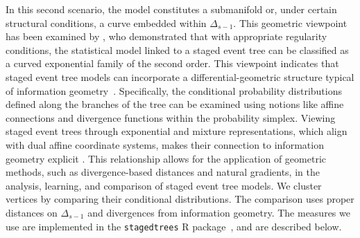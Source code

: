 \documentclass[preprint,12pt]{elsarticle}
\newcommand{\blue}{\color{blue}}
\begin{document}

In this second scenario, the model constitutes a submanifold or, under certain structural conditions, a curve embedded within \( \Delta_{s-1} \). This geometric viewpoint has been examined 
by \cite{leonelli2022curved}, who demonstrated that with appropriate regularity conditions, the statistical model linked to a staged event tree can be classified as a curved exponential family of the second order. This viewpoint indicates that staged event tree models can incorporate a differential-geometric structure typical of information geometry~\cite{amari2016information,pistone2013nonparametric, pistone2019information}. Specifically, the conditional probability distributions defined along the branches of the tree can be examined using notions like affine connections and divergence functions within the probability simplex.  
Viewing staged event trees through exponential and mixture representations, which align with dual affine coordinate systems, makes their connection to information geometry explicit \citep{pistone2019information}.
This relationship allows for the application of geometric methods, such as divergence-based distances and natural gradients, in the analysis, learning, and comparison of staged event tree models. 
We cluster vertices by comparing their conditional distributions. The comparison uses proper distances on $\Delta_{s-1}$ and divergences from information geometry. %
The measures we use are  implemented in the  \texttt{stagedtrees}  R package~\cite{JSSv102i06}, and are described below.
\end{document}
